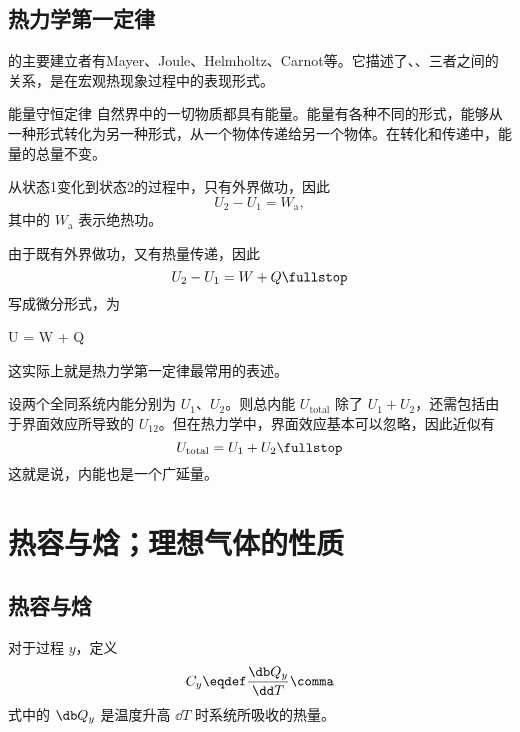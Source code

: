   \subsection{热力学第一定律}
    的主要建立者有Mayer、Joule、Helmholtz、Carnot等。它描述了、、三者之间的关系，是在宏观热现象过程中的表现形式。
    \begin{myThm}{能量守恒定律}
      自然界中的一切物质都具有能量。能量有各种不同的形式，能够从一种形式转化为另一种形式，从一个物体传递给另一个物体。在转化和传递中，能量的总量不变。
    \end{myThm}
    
    \begin{myEnum1}
        从状态1变化到状态2的过程中，只有外界做功，因此
        \begin{equation}
          U_2 - U_1 = W_\text{a} \comma
        \end{equation}
        其中的 $W_\text{a}$ 表示绝热功。
        
      由于既有外界做功，又有热量传递，因此
      \begin{equation} \label{EQ_1ST_LAW_IN_INTEGRAL_FORM}
        U_2 - U_1 = W + Q \fullstop
      \end{equation}
      写成微分形式，为
      \begin{boxedEq} \label{EQ_1ST_LAW_IN_DIFFERENTIAL_FORM}
        \dd U = \db W + \db Q
      \end{boxedEq}
    \end{myEnum1}
    这实际上就是热力学第一定律最常用的表述。
    
    设两个全同系统内能分别为 $U_1$、$U_2$。则总内能 $U_\text{total}$ 除了 $U_1 + U_2$，还需包括由于界面效应所导致的 $U_{12}$。但在热力学中，界面效应基本可以忽略，因此近似有
    \begin{equation}
      U_\text{total} = U_1 + U_2 \fullstop
    \end{equation}
    这就是说，内能也是一个广延量。
    
\section{热容与焓；理想气体的性质} \label{sec:热容与焓；理想气体的性质}
  \subsection{热容与焓} \label{subsec:热容与焓}
    对于过程 $y$，定义
    \begin{equation}
      C_y \eqdef \frac{\db Q_y}{\dd T} \comma
    \end{equation}
    式中的 $\db Q_y$ 是温度升高 $\dd T$ 时系统所吸收的热量。
    
